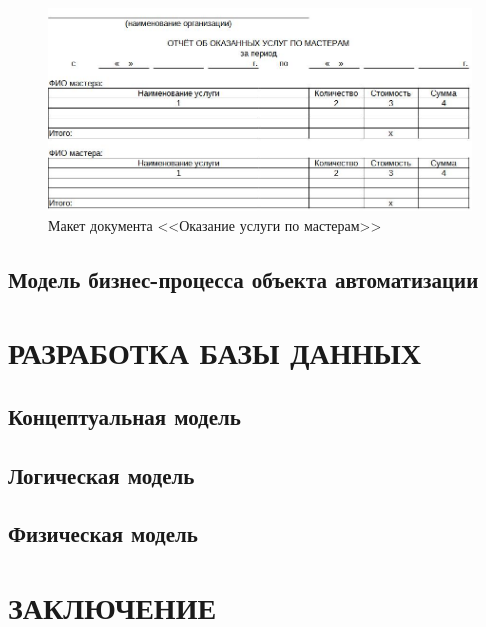 \documentclass[12pt, a4paper, simple]{eskdtext}
\begin{document}
    \begin{figure}[!h]
        \centering
        \includegraphics[width=14cm]
            {_docs/ОТ_ОказУслПоМастеру_макет.jpg}
        \caption{Макет документа <<Оказание услуги по мастерам>>}
        \label{fig:OT_OkazYslPoMastery_maket}
    \end{figure}

    \newpage
    \subsection{Модель бизнес-процесса объекта автоматизации}
    \newpage

    \section{РАЗРАБОТКА БАЗЫ ДАННЫХ}
    \subsection{Концептуальная модель}
    \subsection{Логическая модель}
    \subsection{Физическая модель}
    \newpage

    \newpage
    \section*{ЗАКЛЮЧЕНИЕ}
    \newpage

    \newpage
\end{document}
